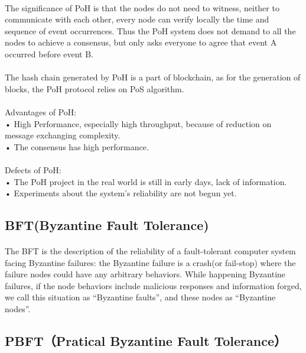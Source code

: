\documentclass[]{article}
\begin{document}
\begin{CJK*}{UTF8}{gbsn}
	\paragraph{} 
	The significance of PoH is that  the nodes do not need to witness, neither to communicate with each other, every node can verify locally the time and sequence of event occurrences. Thus the PoH system does not demand to all the nodes to achieve a consensus, but only asks everyone to agree that event A occurred before event B.
	\paragraph{} 
	The hash chain generated by PoH is a part of blockchain, as for the generation of blocks, the PoH protocol relies on PoS algorithm.
	
	\paragraph{} 
Advantages of PoH:
\\• High Performance, especially high throughput, because of reduction on message exchanging complexity.
\\• The consensus has high performance.
	\paragraph{} 
Defects of PoH:
\\• The PoH project in the real world is still in early days, lack of information.
\\• Experiments about the system's reliability are not begun yet. 
	
	\subsection{BFT(Byzantine Fault Tolerance)}
	\paragraph{} 
	The BFT is the description of the reliability of a fault-tolerant computer system facing Byzantine failures: the Byzantine failure is a crash(or fail-stop) where the failure nodes could have any arbitrary behaviors.
	While happening Byzantine failures, if the node behaviors include malicious responses and information forged, we call this situation as ``Byzantine faults'', and these nodes as ``Byzantine nodes''.
	
\subsection{PBFT（Pratical Byzantine Fault Tolerance）}

\end{CJK*}
\end{document}
